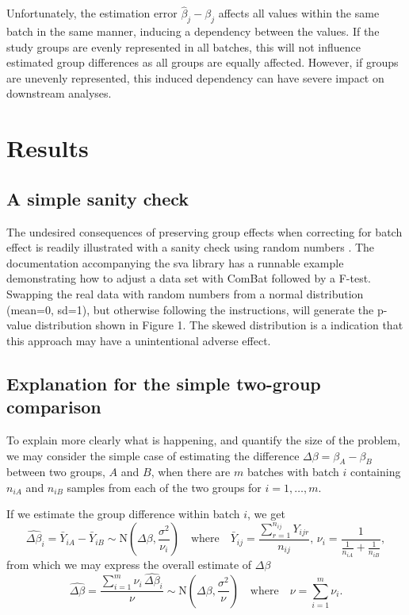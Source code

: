 \documentclass{bio}
\begin{document}
Unfortunately, the estimation error $\hat\beta_j-\beta_j$ affects all values within the same batch in the same manner, inducing a dependency between the values. If the study groups are evenly represented in all batches, this will not influence estimated group differences as all groups are equally affected. However, if groups are unevenly represented, this induced dependency can have severe impact on downstream analyses.


\section{Results}

\subsection{A simple sanity check}

The undesired consequences of preserving group effects when correcting for batch effect is readily illustrated with a sanity check using random numbers . The documentation accompanying the sva library has a runnable example demonstrating how to adjust a data set with ComBat followed by a F-test. Swapping the real data with random numbers from a normal distribution (mean=0, sd=1), but otherwise following the instructions, will generate the p-value distribution shown in Figure 1. The skewed distribution is a indication that this approach may have a unintentional adverse effect. 


\subsection{Explanation for the simple two-group comparison}

To explain more clearly what is happening, and quantify the size of the problem, we may consider the simple case of estimating the difference $\Delta\beta=\beta_A-\beta_B$ between two groups, $A$ and $B$, when there are $m$ batches with batch $i$ containing $n_{iA}$ and $n_{iB}$ samples from each of the two groups for $i=1,\ldots,m$.

If we estimate the group difference within batch $i$, we get
\begin{equation}
\widehat{\Delta\beta}_i=\bar{Y}_{iA}-\bar{Y}_{iB}\sim\text{N}\left(\Delta\beta,\frac{\sigma^2}{\nu_i}\right)
\quad\text{where}\quad
\bar{Y}_{ij}=\frac{\sum_{r=1}^{n_{ij}}Y_{ijr}}{n_{ij}},\,
\nu_i=\frac{1}{\frac{1}{n_{iA}}+\frac{1}{n_{iB}}},
\end{equation}
from which we may express the overall estimate of $\Delta\beta$
\begin{equation}
\widehat{\Delta\beta}=\frac{\sum_{i=1}^m \nu_i\,\widehat{\Delta\beta}_i}{\nu}
\sim\text{N}\left(\Delta\beta,\frac{\sigma^2}{\nu}\right)
\quad\text{where}\quad
\nu=\sum_{i=1}^m\nu_i.
\end{equation}
\end{document}
